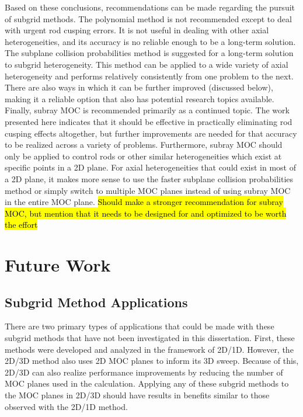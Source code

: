 Based on these conclusions, recommendations can be made regarding the pursuit of subgrid methods.  The polynomial method is not recommended except to deal with urgent rod cusping errors.  It is not useful in dealing with other axial heterogeneities, and its accuracy is no reliable enough to be a long-term solution.  The subplane collision probabilities method is suggested for a long-term solution to subgrid heterogeneity.  This method can be applied to a wide variety of axial heterogeneity and performs relatively consistently from one problem to the next.  There are also ways in which it can be further improved (discussed below), making it a reliable option that also has potential research topics available.  Finally, subray MOC is recommended primarily as a continued topic.  The work presented here indicates that it should be effective in practically eliminating rod cusping effects altogether, but further improvements are needed for that accuracy to be realized across a variety of problems.  Furthermore, subray MOC should only be applied to control rods or other similar heterogeneities which exist at specific points in a 2D plane.  For axial heterogeneities that could exist in most of a 2D plane, it makes more sense to use the faster subplane collision probabilities method or simply switch to multiple MOC planes instead of using subray MOC in the entire MOC plane. \hl{Should make a stronger recommendation for subray MOC, but mention that it needs to be designed for and optimized to be worth the effort}

\section{Future Work}

\subsection{Subgrid Method Applications}

There are two primary types of applications that could be made with these subgrid methods that have not been investigated in this dissertation. First, these methods were developed and analyzed in the framework of 2D/1D.  However, the 2D/3D method also uses 2D MOC planes to inform its 3D sweep.  Because of this, 2D/3D can also realize performance improvements by reducing the number of MOC planes used in the calculation.  Applying any of these subgrid methods to the MOC planes in 2D/3D should have results in benefits similar to those observed with the 2D/1D method.

